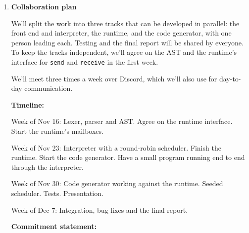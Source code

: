 \documentclass[11pt]{article}
\begin{document}
\begin{enumerate}
\begin{enumerate}[label*=\arabic*.]
\item
\textbf{Challenges.}

In the interpreter, bugs that depend on interleaving may be rare and hard to reproduce, which the seeded scheduler
should help with. In the runtime, concurrency bugs of our own (like a lost wakeup in a mailbox) would make correct
programs hang, so we'll compare against the interpreter to tell these apart from real deadlocks. Networking adds
problems like finding other processes and partial failures, so we'll only attempt it once the in-memory version
works.

\end{enumerate}

\bigbreak


\item
\textbf{Collaboration plan}

We'll split the work into three tracks that can be developed in parallel: the front end and interpreter, the
runtime, and the code generator, with one person leading each. Testing and the final report will be shared by
everyone. To keep the tracks independent, we'll agree on the AST and the runtime's interface for \texttt{send} and
\texttt{receive} in the first week.

\medbreak
We'll meet three times a week over Discord, which we'll also use for day-to-day communication.

\medbreak
\textbf{Timeline:}

\medbreak
Week of Nov 16:
\newline Lexer, parser and AST. Agree on the runtime interface. Start the runtime's mailboxes.

\medbreak
Week of Nov 23:
\newline Interpreter with a round-robin scheduler. Finish the runtime. Start the code generator. Have a small
program running end to end through the interpreter.

\medbreak
Week of Nov 30:
\newline Code generator working against the runtime. Seeded scheduler. Tests. Presentation.

\medbreak
Week of Dec 7:
\newline Integration, bug fixes and the final report.

\medbreak
\textbf{Commitment statement:}


\end{enumerate}
\end{document}
